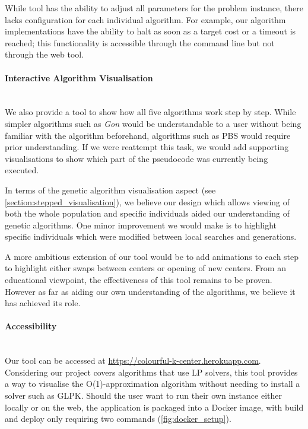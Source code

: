 While tool has the ability to adjust all parameters for the problem instance, there lacks configuration for each individual algorithm. For example, our algorithm implementations have the ability to halt as soon as a target cost or a timeout is reached; this functionality is accessible through the command line but not through the web tool.

\paragraph{Interactive Algorithm Visualisation}~\\
We also provide a tool to show how all five algorithms work step by step. While simpler algorithms such as \emph{Gon} would be understandable to a user without being familiar with the algorithm beforehand, algorithms such as PBS would require prior understanding. If we were reattempt this task, we would add supporting visualisations to show which part of the pseudocode was currently being executed. 

In terms of the genetic algorithm visualisation aspect (see \cref{section:stepped_visualisation}), we believe our design which allows viewing of both the whole population and specific individuals aided our understanding of genetic algorithms. One minor improvement we would make is to highlight specific individuals which were modified between local searches and generations.

A more ambitious extension of our tool would be to add animations to each step to highlight either swaps between centers or opening of new centers. From an educational viewpoint, the effectiveness of this tool remains to be proven. However as far as aiding our own understanding of the algorithms, we believe it has achieved its role.

\paragraph{Accessibility}~\\
Our tool can be accessed at \url{https://colourful-k-center.herokuapp.com}. Considering our project covers algorithms that use LP solvers, this tool provides a way to visualise the O(1)-approximation algorithm without needing to install a solver such as GLPK. Should the user want to run their own instance either locally or on the web, the application is packaged into a Docker image, with build and deploy only requiring two commands (\cref{fig:docker_setup}).


